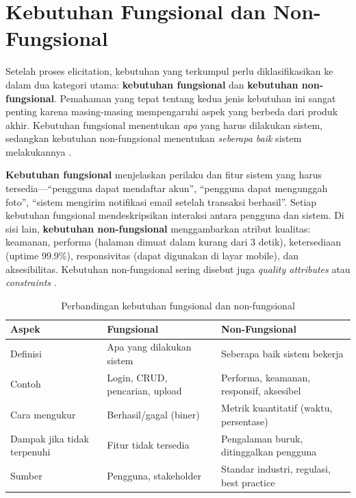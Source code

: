 \section{Kebutuhan Fungsional dan Non-Fungsional}

Setelah proses elicitation, kebutuhan yang terkumpul perlu diklasifikasikan ke dalam dua kategori utama: \textbf{kebutuhan fungsional} dan \textbf{kebutuhan non-fungsional}. Pemahaman yang tepat tentang kedua jenis kebutuhan ini sangat penting karena masing-masing mempengaruhi aspek yang berbeda dari produk akhir. Kebutuhan fungsional menentukan \textit{apa} yang harus dilakukan sistem, sedangkan kebutuhan non-fungsional menentukan \textit{seberapa baik} sistem melakukannya \cite{mdnLearn}.

\textbf{Kebutuhan fungsional} menjelaskan perilaku dan fitur sistem yang harus tersedia---``pengguna dapat mendaftar akun'', ``pengguna dapat mengunggah foto'', ``sistem mengirim notifikasi email setelah transaksi berhasil''. Setiap kebutuhan fungsional mendeskripsikan interaksi antara pengguna dan sistem. Di sisi lain, \textbf{kebutuhan non-fungsional} menggambarkan atribut kualitas: keamanan, performa (halaman dimuat dalam kurang dari 3 detik), ketersediaan (uptime 99.9\%), responsivitas (dapat digunakan di layar mobile), dan aksesibilitas. Kebutuhan non-fungsional sering disebut juga \textit{quality attributes} atau \textit{constraints} \cite{webdevLearn}.

\begin{table}[htbp]
\centering
\begin{tabular}{|P{2.5cm}|P{4cm}|P{5.5cm}|}
\hline
\textbf{Aspek} & \textbf{Fungsional} & \textbf{Non-Fungsional} \\
\hline
Definisi & Apa yang dilakukan sistem & Seberapa baik sistem bekerja \\
\hline
Contoh & Login, CRUD, pencarian, upload & Performa, keamanan, responsif, aksesibel \\
\hline
Cara mengukur & Berhasil/gagal (biner) & Metrik kuantitatif (waktu, persentase) \\
\hline
Dampak jika tidak terpenuhi & Fitur tidak tersedia & Pengalaman buruk, ditinggalkan pengguna \\
\hline
Sumber & Pengguna, stakeholder & Standar industri, regulasi, best practice \\
\hline
\end{tabular}
\caption{Perbandingan kebutuhan fungsional dan non-fungsional}
\end{table}

